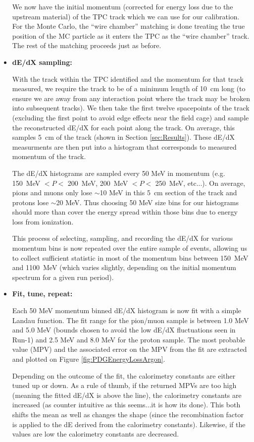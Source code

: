 \begin{itemize}
We now have the initial momentum (corrected for energy loss due to the upstream material) of the TPC track which we can use for our calibration. For the Monte Carlo, the ``wire chamber'' matching is done treating the true position of the MC particle as it enters the TPC as the ``wire chamber'' track. The rest of the matching proceeds just as before.

\item \textbf{dE/dX sampling:}

With the track within the TPC identified and the momentum for that track measured, we require the track to be of a minimum length of 10~cm long (to ensure we are away from any interaction point where the track may be broken into subsequent tracks). We then take the first twelve spacepoints of the track (excluding the first point to avoid edge effects near the field cage) and sample the reconstructed dE/dX for each point along the track. On average, this samples 5~cm of the track (shown in Section \ref{sec:Results}). These dE/dX measurments are then put into a histogram that corresponds to measured momentum of the track.

The dE/dX histograms are sampled every 50 MeV in momentum (e.g. 150~MeV $< P <$ 200~MeV, 200~MeV $< P <$ 250~MeV, etc...). On average, pions and muons only lose $\sim$10 MeV in this 5~cm section of the track and protons lose $\sim$20 MeV. Thus choosing 50 MeV size bins for our histograms should more than cover the energy spread within those bins due to energy loss from ionization.

This process of selecting, sampling, and recording the dE/dX for various momentum bins is now repeated over the entire sample of events, allowing us to collect sufficient statistic in most of the momentum bins between 150~MeV and 1100~MeV (which varies slightly, depending on the initial momentum spectrum for a given run period).

\item \textbf{Fit, tune, repeat:}

Each 50 MeV momentum binned dE/dX histogram is now fit with a simple Landau function. The fit range for the pion/muon sample is between 1.0 MeV and 5.0 MeV (bounds chosen to avoid the low dE/dX fluctuations seen in Run-1) and 2.5 MeV and 8.0 MeV for the proton sample. The most probable value (MPV) and the associated error on the MPV from the fit are extracted and plotted on Figure \ref{fig:PDGEnergyLossArgon}.

Depending on the outcome of the fit, the calorimetry constants are either tuned up or down. As a rule of thumb, if the returned MPVs are too high (meaning the fitted dE/dX is above the line), the calorimetry constants are increased (as counter intuitive as this seems...it is how its done). This both shifts the mean as well as changes the shape (since the recombination factor is applied to the dE derived from the calorimetry constants). Likewise, if the values are low the calorimetry constants are decreased. 


\end{itemize}
